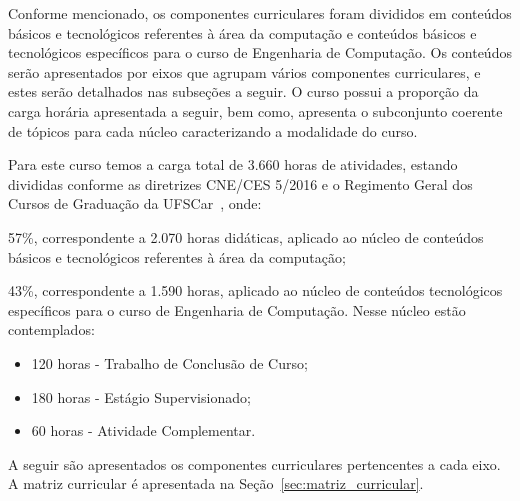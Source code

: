






Conforme mencionado, os componentes curriculares foram divididos em conteúdos básicos e tecnológicos referentes à área da computação e conteúdos básicos e tecnológicos específicos para o curso de Engenharia de Computação. Os conteúdos serão apresentados por eixos que agrupam vários componentes curriculares, e estes serão detalhados nas subseções a seguir.
O curso possui a proporção da carga horária apresentada a seguir, bem como, apresenta o subconjunto coerente de tópicos para cada núcleo caracterizando a modalidade do curso.

Para este curso temos a carga total de 3.660 horas de atividades, estando divididas conforme as diretrizes CNE/CES 5/2016 e o Regimento Geral dos Cursos de Graduação da UFSCar~\cite{RGCG}, onde:

\begin{compenum}
    \item 57\%, correspondente a 2.070 horas didáticas, aplicado ao núcleo de conteúdos básicos e tecnológicos referentes à área da computação;
    \item 43\%, correspondente a 1.590 horas, aplicado ao núcleo de conteúdos tecnológicos específicos para o curso de Engenharia de Computação. Nesse núcleo estão contemplados:
    \begin{itemize}
        \item 120 horas - Trabalho de Conclusão de Curso;
        \item 180 horas - Estágio Supervisionado;
        \item  60 horas - Atividade Complementar.
    \end{itemize}
\end{compenum}

A seguir são apresentados os componentes curriculares pertencentes a cada eixo. A matriz curricular é apresentada na Seção~\ref{sec:matriz_curricular}.


